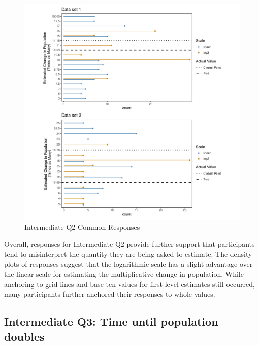 \documentclass[print]{nuthesis}
\begin{document}
\begin{figure}[tbp]

{\centering \includegraphics[width=1\linewidth,]{thesis_files/figure-latex/qi2-common-responses-1} 

}

\caption{Intermediate Q2 Common Responses}\label{fig:qi2-common-responses}
\end{figure}

Overall, responses for Intermediate Q2 provide further support that participants tend to misinterpret the quantity they are being asked to estimate.
The density plots of responses suggest that the logarithmic scale has a slight advantage over the linear scale for estimating the multiplicative change in population.
While anchoring to grid lines and base ten values for first level estimates still occurred, many participants further anchored their responses to whole values.

\hypertarget{intermediate-q3-time-until-population-doubles}{%
\subsection{Intermediate Q3: Time until population doubles}\label{intermediate-q3-time-until-population-doubles}}
\end{document}
